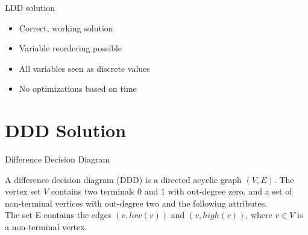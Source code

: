 \begin{frame}{LDD solution}
\begin{itemize}
	\item Correct, working solution
	\item Variable reordering possible
	\item All variables seen as discrete values
	\item No optimizations based on time
\end{itemize}
\end{frame}

\section{DDD Solution}

\begin{frame}{Difference Decision Diagram}
\begin{mydef}
A difference decision diagram (DDD) is a directed acyclic graph $(V,E)$. The vertex set $V$ contains two terminals $0$ and $1$ with out-degree zero, and a set of non-terminal vertices with out-degree two and the following attributes.
\\
The set E contains the edges $(v,low(v))$ and $(v, high(v))$, where $v \in V$ is a non-terminal vertex.
\end{mydef}
\end{frame}

